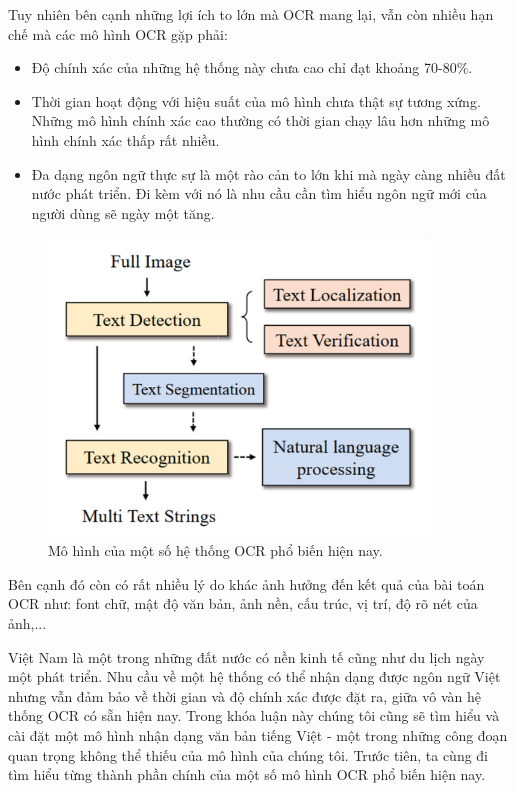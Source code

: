 Tuy nhiên bên cạnh những lợi ích to lớn mà OCR mang lại, vẫn còn nhiều hạn chế mà các
mô hình OCR gặp phải:
\begin{itemize}
    \item Độ chính xác của những hệ thống này chưa cao chỉ đạt khoảng 70-80$\%$.
    \item Thời gian hoạt động với hiệu suất của mô hình chưa thật sự tương xứng. Những mô
hình chính xác cao thường có thời gian chạy lâu hơn những mô hình chính xác thấp
rất nhiều.
\item Đa dạng ngôn ngữ thực sự là một rào cản to lớn khi mà ngày càng nhiều đất nước
phát triển. Đi kèm với nó là nhu cầu cần tìm hiểu ngôn ngữ mới của người dùng sẽ ngày một tăng.
\end{itemize}

\begin{figure}
\centering
\includegraphics[width=0.9\textwidth]{mep_img/typeofproblem.jpg}
\caption{Mô hình của một số hệ thống OCR phổ biến hiện nay. }\label{fig_2.2}
\end{figure}
Bên cạnh đó còn có rất nhiều lý do khác ảnh hưởng đến kết quả của bài toán OCR như:
font chữ, mật độ văn bản, ảnh nền, cấu trúc, vị trí, độ rõ nét của ảnh,...

Việt Nam là một trong những đất nước có nền kinh tế cũng như du lịch ngày một phát triển.
Nhu cầu về một hệ thống có thể nhận dạng được ngôn ngữ Việt nhưng vẫn đảm bảo về thời
gian và độ chính xác được đặt ra, giữa vô vàn hệ thống OCR có sẵn hiện nay. Trong khóa
luận này chúng tôi cũng sẽ tìm hiểu và cài đặt một mô hình nhận dạng văn bản tiếng Việt - một trong
những công đoạn quan trọng không thể thiếu của mô hình của chúng tôi. Trước tiên, ta cùng
đi tìm hiểu từng thành phần chính của một số mô hình OCR phổ biến hiện nay.



